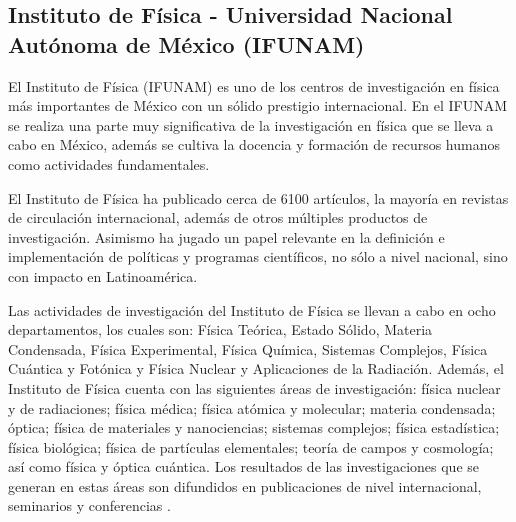 \subsection{Instituto de Física - Universidad Nacional Autónoma de México (IFUNAM)}
El Instituto de Física (IFUNAM) es uno de los centros de investigación en física más importantes de México con un sólido prestigio internacional. En el IFUNAM se realiza una parte muy significativa de la investigación en física que se lleva a cabo en México, además se cultiva la docencia y formación de recursos humanos como actividades fundamentales.

El Instituto de Física ha publicado cerca de 6100 artículos, la mayoría en revistas de circulación internacional, además de otros múltiples productos de investigación. Asimismo ha jugado un papel relevante en la definición e implementación de políticas y programas científicos, no sólo a nivel nacional, sino con impacto en Latinoamérica.

 

Las actividades de investigación del Instituto de Física se llevan a cabo en ocho departamentos, los cuales son: Física Teórica, Estado Sólido, Materia Condensada, Física Experimental, Física Química, Sistemas Complejos, Física Cuántica y Fotónica y Física Nuclear y Aplicaciones de la Radiación. Además, el Instituto de Física cuenta con las siguientes áreas de investigación: física nuclear y de radiaciones; física médica; física atómica y molecular; materia condensada; óptica; física de materiales y nanociencias; sistemas complejos; física estadística; física biológica; física de partículas elementales; teoría de campos y cosmología; así como física y óptica cuántica. Los resultados de las investigaciones que se generan en estas áreas son difundidos en publicaciones de nivel internacional, seminarios y conferencias \cite{ifunam}.




